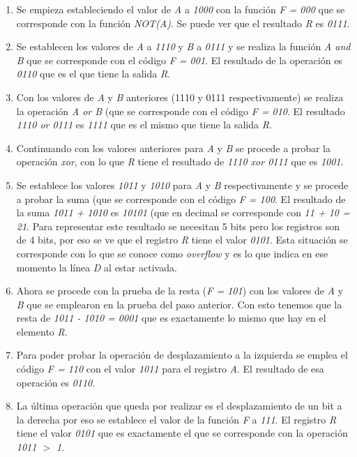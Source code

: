 \documentclass{article}
\begin{document}
\begin{enumerate}
	\item Se empieza estableciendo el valor de \emph{A} a \emph{1000} con la función \emph{F = 000} que se corresponde con la función \emph{NOT(A)}. Se puede ver que el resultado \emph{R} es \emph{0111}.
	\item Se establecen los valores de \emph{A} a \emph{1110} y \emph{B} a \emph{0111} y se realiza la función \emph{A and B} que se corresponde con el código \emph{F = 001}. El resultado de la operación es \emph{0110} que es el que tiene la salida \emph{R}.
	\item Con los valores de \emph{A} y \emph{B} anteriores (1110 y 0111 respectivamente) se realiza la operación \emph{A or B} (que se corresponde con el código \emph{F = 010}. El resultado \emph{1110 or 0111} es \emph{1111} que es el mismo que tiene la salida \emph{R}.
	\item Continuando con los valores anteriores para \emph{A} y \emph{B} se procede a probar la operación \emph{xor}, con lo que \emph{R} tiene el resultado de \emph{1110 xor 0111} que es \emph{1001}.
	\item Se establece los valores \emph{1011} y \emph{1010} para \emph{A} y \emph{B} respectivamente y se procede a probar la suma (que se corresponde con el código \emph{F = 100}. El resultado de la suma \emph{1011 + 1010} es \emph{10101} (que en decimal se corresponde con \emph{11 + 10 = 21}. Para representar este resultado se necesitan 5 bits pero los registros son de 4 bits, por eso se ve que el registro \emph{R} tiene el valor \emph{0101}. Esta situación se corresponde con lo que se conoce como \emph{overflow} y es lo que indica en ese momento la línea \emph{D} al estar activada.
	\item Ahora se procede con la prueba de la resta (\emph{F = 101}) con los valores de \emph{A} y \emph{B} que se emplearon en la prueba del paso anterior. Con esto tenemos que la resta de \emph{1011 - 1010 = 0001} que es exactamente lo mismo que hay en el elemento \emph{R}.
	\item  Para poder probar la operación de desplazamiento a la izquierda se emplea el código \emph{F = 110} con el valor \emph{1011} para el registro \emph{A}. El resultado de esa operación es \emph{0110}.
	\item La última operación que queda por realizar es el desplazamiento de un bit a la derecha por eso se establece el valor de la función \emph{F} a \emph{111}. El registro \emph{R} tiene el valor \emph{0101} que es exactamente el que se corresponde con la operación \emph{1011 $>$ 1}.
\end{enumerate}
\end{document}
